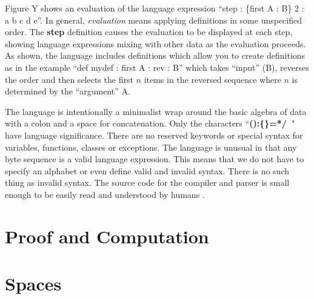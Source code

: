 \documentclass[11pt]{article}
\begin{document}
Figure Y shows an evaluation of the language expression ``step : \{first A : B\} 2 : a b c d e''.  In general, {\it evaluation} means applying 
definitions in some unspecified order.  The {\bf step} definition causes the evaluation to be displayed at each step, showing language expressions 
mixing with other data as the evaluation proceeds.  As shown, the language includes definitions which allow you to create definitions as in the 
example ``def mydef : {first A : rev : B}'' which takes ``input'' (B), reverses the order and then selects the first $n$ items in the reversed sequence 
where $n$ is determined by the ``argument'' A.  

     The language is intentionally a minimalist wrap around the basic algebra of data with a colon and a space for concatenation.   
Only the characters ``{\bf():\{\}=*/\ }" have language significance.  There are no reserved keywords or 
special syntax for variables, functions, classes or exceptions.  The language is unusual in that any byte sequence is a valid language expression.  This means 
that we do not have to specify an alphabet or even define valid and invalid syntax.  There is no such thing 
as invalid syntax.  The source code for the compiler and parser is small enough to be easily read and understood by humans \cite{github}.

\section{Proof and Computation}
\section{Spaces}
\end{document}
